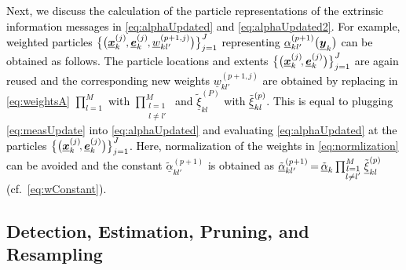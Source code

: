 \documentclass[10pt, twoside, romanappendices]{IEEEtran}
\providecommand{\rd}{\textcolor{black}}
\providecommand{\ist}{\hspace*{.3mm}}
\providecommand{\rmv}{\hspace*{-.3mm}}
\begin{document}
\rd{Next, we discuss the calculation of \vspace{0mm} the particle representations of the extrinsic \vspace{.3mm} information messages in \eqref{eq:alphaUpdated} and \eqref{eq:alphaUpdated2}. For example, weighted \vspace{-.7mm} particles $\big\{ \big( \underline{\V{x}}^{(j)}_{k} \rmv, \underline{\V{e}}^{(j)}_{k} \rmv,  \underline{w}^{(p+1,j)}_{kl'} \big) \big\}_{j=1}^{J}$ \vspace{0mm} representing $\underline{\alpha}_{kl'}^{(p+1)}\big(\underline{\bm{y}}_{k}\big)$ can be obtained as follows. The particle locations and extents $\big\{ \big( \underline{\V{x}}^{(j)}_{k}\rmv\rmv, \underline{\V{e}}^{(j)}_{k} \big) \big\}_{j=1}^{J}$ are again reused and the corresponding new weights $\underline{w}^{(p+1,j)}_{kl'}$ are obtained by \vspace{.8mm} replacing in \eqref{eq:weightsA} $\prod^{M}_{l=1}$ with $\prod^{M}_{\substack{l=1\\l \neq l'}}$ and $\tilde{\underline{\xi}}_{kl}^{(P)}$ with $\tilde{\underline{\xi}}_{kl}^{(p)} \rmv$\vspace{-.3mm}. This is equal to plugging \eqref{eq:measUpdate} into \eqref{eq:alphaUpdated} and evaluating \eqref{eq:alphaUpdated} at\vspace{.4mm} the particles $\big\{ \big( \underline{\V{x}}^{(j)}_{k}\rmv\rmv, \underline{\V{e}}^{(j)}_{k} \big) \big\}_{j=1}^{J}$. Here\vspace{-.5mm}, normalization of the weights in \eqref{eq:normlization} can be avoided and the constant $\tilde{\underline{\alpha}}_{kl'}^{(p+1)}$ \vspace{-.2mm} is obtained as $\tilde{\underline{\alpha}}_{kl'}^{(p+1)} \rmv=\rmv \tilde{\underline{\alpha}}_k\prod^{M}_{\substack{l=1\\l \neq l'}}  \ist  \tilde{\underline{\xi}}_{kl}^{(p)}$ (cf.~\eqref{eq:wConstant}).}



\subsection{Detection, Estimation, Pruning, and Resampling}
\label{sec:resampling}

\vspace{.7mm}
\end{document}
